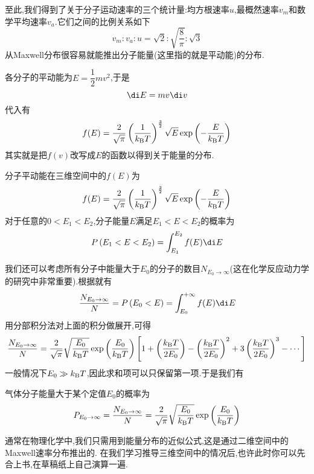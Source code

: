 \documentclass{ctexart}
\begin{document}
至此,我们得到了关于分子运动速率的三个统计量:均方根速率$u$,最概然速率$v_m$和数学平均速率$v_a$.它们之间的比例关系如下
\[v_m:v_a:u=\sqrt2:\sqrt{\dfrac8\pi}:\sqrt3\]
\indent 从Maxwell分布很容易就能推出分子能量(这里指的就是平动能)的分布.
\begin{derivation}
    各分子的平动能为$E=\dfrac12mv^2$,于是
    \[\di E=mv\di v\]
    代入有
    \[f(E)=\dfrac{2}{\sqrt\pi}\left(\dfrac{1}{k_\text BT}\right)^{\frac32}\sqrt{E}\exp\left(-\dfrac{E}{k_\text BT}\right)\]
    其实就是把$f(v)$改写成$E$的函数以得到关于能量的分布.
\end{derivation}
\begin{theorem}[1B.3.1 三维空间中的能量分布函数]
    分子平动能在三维空间中的$f(E)$为
    \[f(E)=\dfrac{2}{\sqrt\pi}\left(\dfrac{1}{k_\text BT}\right)^{\frac32}\sqrt{E}\exp\left(-\dfrac{E}{k_\text BT}\right)\]
    对于任意的$0<E_1<E_2$,分子能量$E$满足$E_1<E<E_2$的概率为
    \[P\left(E_1<E<E_2\right)=\int_{E_1}^{E_2}f(E)\di E\]

\end{theorem}
我们还可以考虑所有分子中能量大于$E_0$的分子的数目$N_{E_0\to\infty}$(这在化学反应动力学的研究中非常重要).根据就有
\[\dfrac{N_{E_0\to\infty}}{N}=P\left(E_0<E\right)=\int_{E_0}^{+\infty}f(E)\di E\]
用分部积分法对上面的积分做展开,可得
\[\dfrac{N_{E_0\to\infty}}{N}=\dfrac{2}{\sqrt\pi}\sqrt{\dfrac{E_0}{k_\text BT}}\exp\left(\dfrac{E_0}{k_\text BT}\right)\left[1+\left(\dfrac{k_\text BT}{2E_0}\right)-\left(\dfrac{k_\text BT}{2E_0}\right)^2+3\left(\dfrac{k_\text BT}{2E_0}\right)^3-\cdots\right]\]
一般情况下$E_0\gg k_\text BT$,因此求和项可以只保留第一项.于是我们有
\begin{theorem}[1B.3.2 大于某个能量值的分子数目]
    气体分子能量大于某个定值$E_0$的概率为
    \[P_{E_0\to\infty}=\dfrac{N_{E_0\to\infty}}{N}=\dfrac{2}{\sqrt\pi}\sqrt{\dfrac{E_0}{k_\text BT}}\exp\left(\dfrac{E_0}{k_\text BT}\right)\]

\end{theorem}
通常在物理化学中,我们只需用到能量分布的近似公式,这是通过二维空间中的Maxwell速率分布推出的.%
在我们学习推导三维空间中的情况后,也许此时你可以先合上书,在草稿纸上自己演算一遍.
\end{document}
